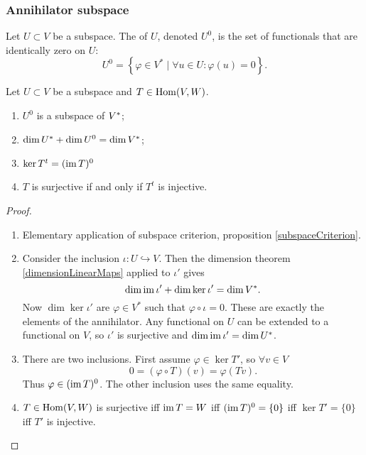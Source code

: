 \subsubsection{Annihilator subspace}
\begin{definition}
Let $U\subset V$ be a subspace. The  of $U$, denoted $U^0$, is the set of functionals that are identically zero on $U$:
\[ U^0 = \left\{ \varphi\in V^*\;|\; \forall u\in U:\varphi(u) = 0 \right\}. \]
\end{definition}
\begin{proposition} \label{annihilatorSpace}
Let $U\subset V$ be a subspace and $T\in \operatorname{Hom}(V,W)$.
\begin{enumerate}
\item $U^0$ is a subspace of ${V}^*$;
\item $\dim {U}^* + \dim U^0 = \dim {V}^*$;
\item $\ker T^t = (\operatorname{im} T)^0$
\item $T$ is surjective \textup{if and only if} $T^t$ is injective.
\end{enumerate}
\end{proposition}
\begin{proof}
\mbox{}
\begin{enumerate}
\item Elementary application of subspace criterion, proposition \ref{subspaceCriterion}.
\item Consider the inclusion $\iota: U\hookrightarrow V$. Then the dimension theorem \ref{dimensionLinearMaps} applied to $\iota'$ gives
\[ \dim \operatorname{im} \iota' + \dim \ker\iota' = \dim V^*. \]
Now $\dim \ker\iota'$ are $\varphi\in V^*$ such that $\varphi \circ \iota = 0$. These are exactly the elements of the annihilator. Any functional on $U$ can be extended to a functional on $V$, so $\iota'$ is surjective and $\dim \operatorname{im} \iota' = \dim U^*$.
\item There are two inclusions. First assume $\varphi \in \ker T'$, so $\forall v\in V$
\[ 0 = (\varphi\circ T)(v) = \varphi(Tv). \]
Thus $\varphi\in(\operatorname{im} T)^0$. The other inclusion uses the same equality.
\item $T\in\operatorname{Hom}(V,W)$ is surjective iff $\operatorname{im} T = W$ iff $(\operatorname{im} T)^0 = \{0\}$ iff $\ker T' = \{0\}$ iff $T'$ is injective.
\end{enumerate}
\end{proof}


